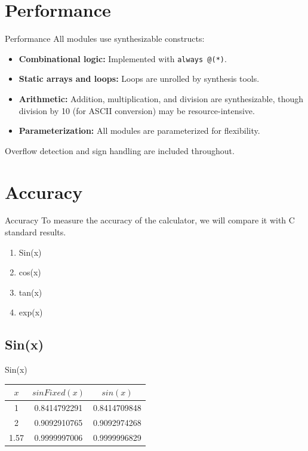 \documentclass{beamer}
\theoremstyle{remark}
\begin{document}
\section{Performance}
\begin{frame}{Performance}
All modules use synthesizable constructs:
\begin{itemize}
    \item \textbf{Combinational logic:} Implemented with \texttt{always @(*)}.
    \item \textbf{Static arrays and loops:} Loops are unrolled by synthesis tools.
    \item \textbf{Arithmetic:} Addition, multiplication, and division are synthesizable, though division by 10 (for ASCII conversion) may be resource-intensive.
    \item \textbf{Parameterization:} All modules are parameterized for flexibility.
\end{itemize}
Overflow detection and sign handling are included throughout.
\end{frame}

\section{Accuracy}
\begin{frame}{Accuracy}
To measure the accuracy of the calculator, we will compare it with C standard results.
\begin{enumerate}
    \item Sin(x)
    \item cos(x)
    \item tan(x)
    \item exp(x)
\end{enumerate}
\end{frame}

\subsection{Sin(x)}
\begin{frame}{Sin(x)}
    \begin{table}[h!]
\centering
\begin{tabular}{|c|c|c|}
\hline
$x$ & $sinFixed(x)$ & $sin(x)$ \\
\hline
1    & 0.8414792291   & 0.8414709848 \\
2    & 0.9092910765   & 0.9092974268 \\
1.57 & 0.9999997006   & 0.9999996829 \\
\hline
\end{tabular}
\end{table}
\end{frame}
\end{document}
